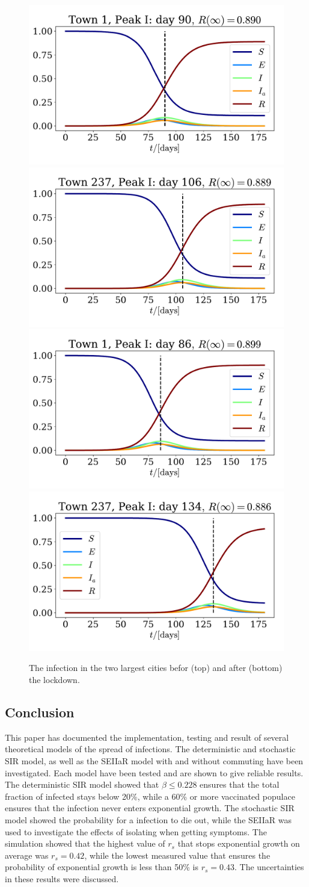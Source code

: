 \documentclass{article}
\begin{document}
    \begin{figure}[H]
        \centering
        \includegraphics[width=.4\textwidth]{../plots/2D/Oslo.pdf}
        \includegraphics[width=.4\textwidth]{../plots/2D/Bergen.pdf}
        \includegraphics[width=.4\textwidth]{../plots/2D/Oslolockdown.pdf}
        \includegraphics[width=.4\textwidth]{../plots/2D/Bergenlockdown.pdf}
        \caption{The infection in the two largest cities befor (top) and after (bottom) the lockdown.}
        \label{Oslo Bergen}
    \end{figure}
    
    \subsection*{Conclusion}
    This paper has documented the implementation, testing and result of several theoretical models of the spread of infections.
    The deterministic and stochastic SIR model, as well as the SEIIaR model with and without commuting have been investigated.
    Each model have been tested and are shown to give reliable results.
    The deterministic SIR model showed that $\beta \leq 0.228$ ensures that the total fraction of infected stays below 20\%, while a 60\% or more vaccinated populace ensures that the infection never enters exponential growth.
    The stochastic SIR model showed the probability for a infection to die out, while the SEIIaR was used to investigate the effects of isolating when getting symptoms.
    The simulation showed that the highest value of $r_s$ that stops exponential growth on average was $r_s=0.42$, 
    while the lowest measured value that ensures the probability of exponential growth is less than 50\% is $r_s=0.43$. 
    The uncertainties in these results were discussed.
\end{document}

